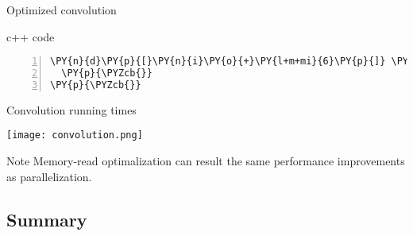 \documentclass{beamer}
\begin{document}
\begin{frame}[fragile]{Optimized convolution}
\begin{block}{c++ code}
\begin{Verbatim}[commandchars=\\\{\},numbers=left,firstnumber=1,stepnumber=1]
    \PY{n}{d}\PY{p}{[}\PY{n}{i}\PY{o}{+}\PY{l+m+mi}{6}\PY{p}{]} \PY{o}{=} \PY{p}{(}\PY{n}{c}\PY{p}{[}\PY{l+m+mi}{1}\PY{p}{]} \PY{o}{=} \PY{n}{p}\PY{p}{[}\PY{n}{i}\PY{o}{+}\PY{l+m+mi}{6}\PY{p}{]}\PY{p}{)}\PY{o}{*}\PY{n}{k}\PY{p}{[}\PY{l+m+mi}{0}\PY{p}{]}\PY{o}{+}\PY{n}{c}\PY{p}{[}\PY{l+m+mi}{2}\PY{p}{]}\PY{o}{*}\PY{n}{k}\PY{p}{[}\PY{l+m+mi}{2}\PY{p}{]}\PY{o}{+}\PY{n}{c}\PY{p}{[}\PY{l+m+mi}{3}\PY{p}{]}\PY{o}{*}\PY{n}{k}\PY{p}{[}\PY{l+m+mi}{2}\PY{p}{]}\PY{o}{+}\PY{n}{c}\PY{p}{[}\PY{l+m+mi}{4}\PY{p}{]}\PY{o}{*}\PY{n}{k}\PY{p}{[}\PY{l+m+mi}{3}\PY{p}{]}\PY{o}{+}\PY{n}{c}\PY{p}{[}\PY{l+m+mi}{5}\PY{p}{]}\PY{o}{*}\PY{n}{k}\PY{p}{[}\PY{l+m+mi}{4}\PY{p}{]}\PY{o}{+}\PY{n}{c}\PY{p}{[}\PY{l+m+mi}{6}\PY{p}{]}\PY{o}{*}\PY{n}{k}\PY{p}{[}\PY{l+m+mi}{5}\PY{p}{]}\PY{o}{+}\PY{n}{c}\PY{p}{[}\PY{l+m+mi}{0}\PY{p}{]}\PY{o}{*}\PY{n}{k}\PY{p}{[}\PY{l+m+mi}{6}\PY{p}{]}\PY{p}{;}
  \PY{p}{\PYZcb{}}
\PY{p}{\PYZcb{}}
\end{Verbatim}


\end{block}

\end{frame}



\begin{frame}[fragile]{Convolution running times}

\begin{center}
\texttt{[image: convolution.png]}  
\end{center}


\begin{exampleblock}{Note}
\small
Memory-read optimalization can result the same performance improvements as parallelization.
\end{exampleblock}

\end{frame}




\subsection{Summary}
\end{document}
